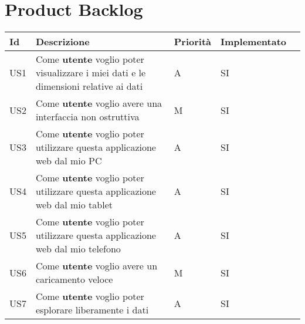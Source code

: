 \section{Product Backlog}
\begin{longtable} {
		|>{}p{10mm}| 
		|>{}p{70mm}|
		|>{}p{15mm}|
		|>{}p{25mm}|
		>{}p{0mm}}
	\hline
	\textbf{Id} & \textbf{Descrizione} & \textbf{Priorità} & \textbf{Implementato} \\ \hline
	US1 & Come \textbf{utente} voglio poter visualizzare i miei dati e le dimensioni relative ai dati & A & SI \\ \hline
	
	US2 & Come \textbf{utente} voglio avere una interfaccia non ostruttiva & M & SI \\ \hline
	
	US3 & Come \textbf{utente} voglio poter utilizzare questa applicazione web dal mio PC & A & SI \\ \hline
	
	US4 & Come \textbf{utente} voglio poter utilizzare questa applicazione web dal mio tablet & A & SI \\ \hline
	
	US5 & Come \textbf{utente} voglio poter utilizzare questa applicazione web dal mio telefono & A & SI \\ \hline
	
	US6 & Come \textbf{utente} voglio avere un caricamento veloce & M & SI \\ \hline
	
	US7 & Come \textbf{utente} voglio poter esplorare liberamente i dati & A & SI \\ \hline
	
\end{longtable}
\newpage

